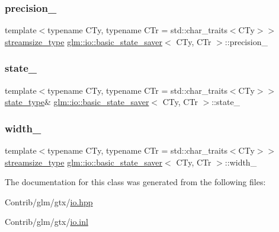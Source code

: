 \subsubsection{\texorpdfstring{precision\+\_\+}{precision\_}}
{\footnotesize\ttfamily template$<$typename C\+Ty, typename C\+Tr = std\+::char\+\_\+traits$<$\+C\+Ty$>$$>$ \\
\mbox{\hyperlink{classglm_1_1io_1_1basic__state__saver_a0a4c44df9a4fcf7531af6da7698e0931}{streamsize\+\_\+type}} \mbox{\hyperlink{classglm_1_1io_1_1basic__state__saver}{glm\+::io\+::basic\+\_\+state\+\_\+saver}}$<$ C\+Ty, C\+Tr $>$\+::precision\+\_\+\hspace{0.3cm}{\ttfamily [private]}}

\mbox{\label{classglm_1_1io_1_1basic__state__saver_a969e854089f2df42ee0050d38cc70903}} 
\subsubsection{\texorpdfstring{state\+\_\+}{state\_}}
{\footnotesize\ttfamily template$<$typename C\+Ty, typename C\+Tr = std\+::char\+\_\+traits$<$\+C\+Ty$>$$>$ \\
\mbox{\hyperlink{classglm_1_1io_1_1basic__state__saver_a84787cc03192543bfe67ef25e7f20aa6}{state\+\_\+type}}\& \mbox{\hyperlink{classglm_1_1io_1_1basic__state__saver}{glm\+::io\+::basic\+\_\+state\+\_\+saver}}$<$ C\+Ty, C\+Tr $>$\+::state\+\_\+\hspace{0.3cm}{\ttfamily [private]}}

\mbox{\label{classglm_1_1io_1_1basic__state__saver_a7c2f48c587295d3717b0b6790f78034d}} 
\subsubsection{\texorpdfstring{width\+\_\+}{width\_}}
{\footnotesize\ttfamily template$<$typename C\+Ty, typename C\+Tr = std\+::char\+\_\+traits$<$\+C\+Ty$>$$>$ \\
\mbox{\hyperlink{classglm_1_1io_1_1basic__state__saver_a0a4c44df9a4fcf7531af6da7698e0931}{streamsize\+\_\+type}} \mbox{\hyperlink{classglm_1_1io_1_1basic__state__saver}{glm\+::io\+::basic\+\_\+state\+\_\+saver}}$<$ C\+Ty, C\+Tr $>$\+::width\+\_\+\hspace{0.3cm}{\ttfamily [private]}}



The documentation for this class was generated from the following files\+:\begin{DoxyCompactItemize}
\item 
Contrib/glm/gtx/\mbox{\hyperlink{io_8hpp}{io.\+hpp}}\item 
Contrib/glm/gtx/\mbox{\hyperlink{io_8inl}{io.\+inl}}\end{DoxyCompactItemize}
